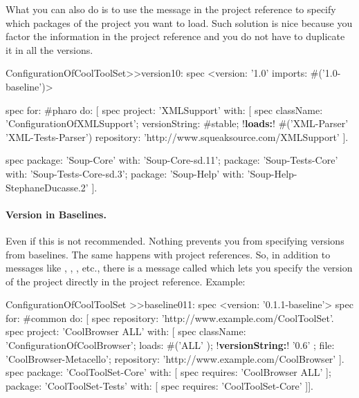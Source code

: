 \documentclass[a4paper,10pt,twoside]{book}
\begin{document}
What you can also do is to use the  message in the project reference to specify which packages of the project you want to load. Such solution is nice because you factor the information in the project reference and you do not have to duplicate it in all the versions.

\begin{code}{}
ConfigurationOfCoolToolSet>>version10: spec 
	<version: '1.0' imports:  #('1.0-baseline')>
	 
	spec for: #pharo do: [	
		spec project: 'XMLSupport' with: [
                       spec className: 'ConfigurationOfXMLSupport';
                       versionString: #stable;
                       !\textbf{loads:}! #('XML-Parser' 'XML-Tests-Parser') 
                       repository: 'http://www.squeaksource.com/XMLSupport' ].

	spec 
			package: 'Soup-Core' with: 'Soup-Core-sd.11'; 
			package: 'Soup-Tests-Core' with: 'Soup-Tests-Core-sd.3';
			package: 'Soup-Help' with: 'Soup-Help-StephaneDucasse.2' ].
\end{code}



\paragraph{Version in Baselines.} Even if this is not recommended. Nothing prevents you from specifying versions from baselines. The same happens with project references. So, in addition to messages like , , , etc., there is a message called  which lets you specify the version of the project directly in the project reference. Example:

\begin{code}{}
ConfigurationOfCoolToolSet >>baseline011: spec 
       <version: '0.1.1-baseline'>
       spec for: #common do: [
              spec repository: 'http://www.example.com/CoolToolSet'.
              spec project: 'CoolBrowser ALL' with: [
                            spec 
                                   className: 'ConfigurationOfCoolBrowser';
                                   loads: #('ALL' );
                                   !\textbf{versionString:}! '0.6' ;
                                   file: 'CoolBrowser-Metacello';
                                   repository: 'http://www.example.com/CoolBrowser' ].
              spec 
                     package: 'CoolToolSet-Core' with: [ spec requires: 'CoolBrowser ALL' ];
                     package: 'CoolToolSet-Tests' with: [ spec requires: 'CoolToolSet-Core' ]].
\end{code}       
\end{document}
